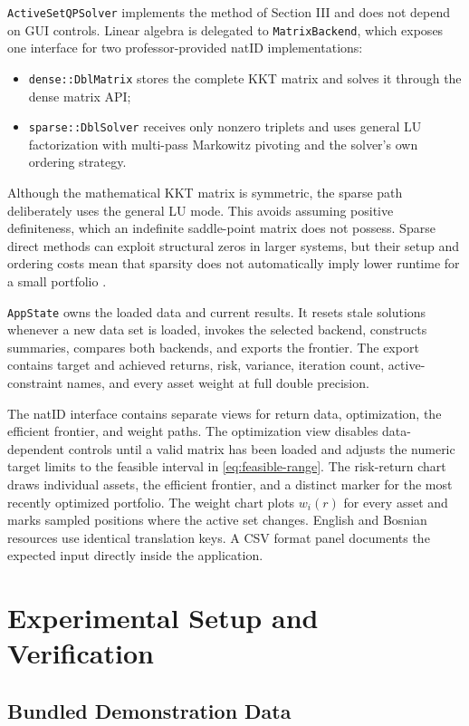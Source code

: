 \documentclass[conference]{IEEEtran}
\begin{document}
\texttt{ActiveSetQPSolver} implements the method of Section III and does not
depend on GUI controls. Linear algebra is delegated to
\texttt{MatrixBackend}, which exposes one interface for two professor-provided
natID implementations:
\begin{itemize}
    \item \texttt{dense::DblMatrix} stores the complete KKT matrix and solves
    it through the dense matrix API;
    \item \texttt{sparse::DblSolver} receives only nonzero triplets and uses
    general LU factorization with multi-pass Markowitz pivoting and the
    solver's own ordering strategy.
\end{itemize}
Although the mathematical KKT matrix is symmetric, the sparse path deliberately
uses the general LU mode. This avoids assuming positive definiteness, which an
indefinite saddle-point matrix does not possess. Sparse direct methods can
exploit structural zeros in larger systems, but their setup and ordering costs
mean that sparsity does not automatically imply lower runtime for a small
portfolio \cite{davis2006}.

\texttt{AppState} owns the loaded data and current results. It resets stale
solutions whenever a new data set is loaded, invokes the selected backend,
constructs summaries, compares both backends, and exports the frontier. The
export contains target and achieved returns, risk, variance, iteration count,
active-constraint names, and every asset weight at full double precision.

The natID interface contains separate views for return data, optimization,
the efficient frontier, and weight paths. The optimization view disables
data-dependent controls until a valid matrix has been loaded and adjusts the
numeric target limits to the feasible interval in \eqref{eq:feasible-range}.
The risk-return chart draws individual assets, the efficient frontier, and a
distinct marker for the most recently optimized portfolio. The weight chart
plots $w_i(r)$ for every asset and marks sampled positions where the active set
changes. English and Bosnian resources use identical translation keys. A CSV
format panel documents the expected input directly inside the application.

\section{Experimental Setup and Verification}

\subsection{Bundled Demonstration Data}
\end{document}
